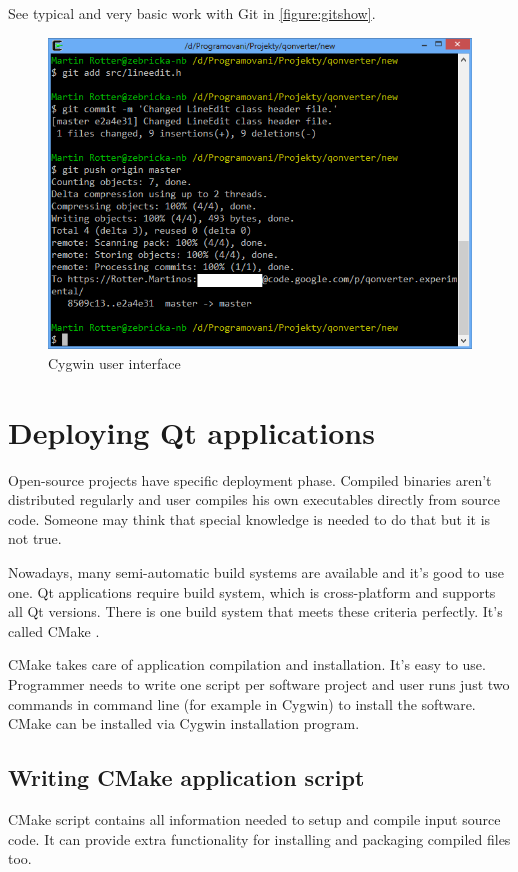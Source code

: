 See typical and very basic work with Git in \autoref{figure:gitshow}.

\begin{figure}[ht]
\begin{center}
\includegraphics[width=12cm]{graphics/real-world/05-gitshow.png}
\caption{Cygwin user interface}\label{figure:gitshow}
\end{center}
\end{figure}

\section{Deploying Qt applications}
Open-source projects have specific deployment phase. Compiled binaries aren't distributed regularly and user compiles his own executables directly from source code. Someone may think that special knowledge is needed to do that but it is not true.

Nowadays, many semi-automatic build systems are available and it's good to use one. Qt applications require build system, which is cross-platform and supports all Qt versions. There is one build system that meets these criteria perfectly. It's called CMake \citep{various:cmake}.

CMake takes care of application compilation and installation. It's easy to use. Programmer needs to write one script per software project and user runs just two commands in command line (for example in Cygwin) to install the software. CMake can be installed via Cygwin installation program.

\subsection{Writing CMake application script}
CMake script contains all information needed to setup and compile input source code. It can provide extra functionality for installing and packaging compiled files too.

